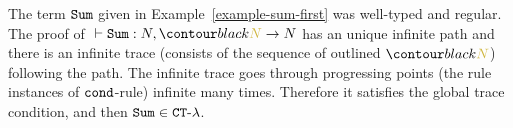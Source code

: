 \begin{Eg}\label{example-sum}
The term ${\tt Sum}$ given in Example~\ref{example-sum-first} was well-typed and regular.
The proof of $\ \vdash \Sum:\N,\goldNout \rightarrow \N$ has an unique infinite path
and there is an infinite trace (consists of the sequence of outlined $\goldNout$) 
following the path. 
The infinite trace goes through progressing points (the rule instances of ${\tt cond}$-rule)
infinite many times. Therefore it satisfies the global trace condition, and then ${\tt Sum} \in { {\tt CT}\mbox{-}\lambda}$. 


\end{Eg}

